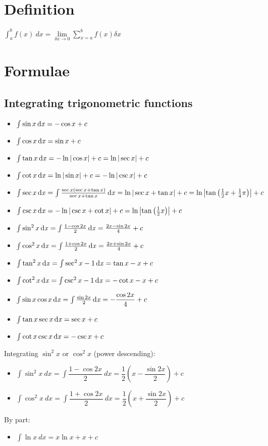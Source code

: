 \section{Definition}
$\int_{a}^{b} f(x) \: dx = \lim\limits_{\delta x\rightarrow0}\sum_{x=a}^{b}f(x)\delta x$

\section{Formulae}
\subsection{Integrating trigonometric functions}
\begin{itemize}
    \item $\int\sin x \operatorname{\mathrm{d}\mathit{x}} = -\cos x + c$
    \item $\int\cos x \operatorname{\mathrm{d}\mathit{x}} = \sin x + c$
    \item $\int \tan x \operatorname{\mathrm{d}\mathit{x}} = -\ln |\cos x| + c= \ln |\sec x| + c$
    \item $\int \cot x \operatorname{\mathrm{d}\mathit{x}} = \ln |\sin x| + c = -\ln |\csc x| + c$
    \item $\int \sec x \operatorname{\mathrm{d}\mathit{x}} = \int \frac{\sec x(\sec x + \tan x)}{\sec x + \tan x} \operatorname{\mathrm{d}\mathit{x}} = \ln |\sec x + \tan x| + c = \ln \left|\tan\left(\frac{1}{2}x+\frac{1}{4}\pi \right)\right| + c$
    \item $\int \csc x \operatorname{\mathrm{d}\mathit{x}} = -\ln|\csc x + \cot x| + c = \ln \left|\tan\left(\frac{1}{2}x\right)\right| + c$
    \item $\int \sin^2 x \operatorname{\mathrm{d}\mathit{x}} = \int \frac{1-\cos 2x}{2} \operatorname{\mathrm{d}\mathit{x}} = \frac{2x-\sin 2x}{4} + c$
    \item $\int \cos^2 x \operatorname{\mathrm{d}\mathit{x}} = \int \frac{1+\cos 2x}{2} \operatorname{\mathrm{d}\mathit{x}} = \frac{2x+\sin 2x}{4} + c$
    \item $\int \tan^2 x \operatorname{\mathrm{d}\mathit{x}} = \int \sec^2 x -1 \operatorname{\mathrm{d}\mathit{x}} = \tan x - x + c$
    \item $\int \cot^2 x \operatorname{\mathrm{d}\mathit{x}} = \int \csc^2 x -1 \operatorname{\mathrm{d}\mathit{x}} = -\cot x - x + c$
    \item $\int \sin x \cos x \operatorname{\mathrm{d}\mathit{x}} = \int \frac{\sin 2x}{2} \operatorname{\mathrm{d}\mathit{x}} = -\dfrac{\cos 2x}{4} + c$
    \item $\int \tan x \sec x \operatorname{\mathrm{d}\mathit{x}} = \sec x + c$
    \item $\int \cot x \csc x \operatorname{\mathrm{d}\mathit{x}} = -\csc x + c$
\end{itemize}
Integrating $\sin^2x$ or $\cos^2x$ (power descending):
\begin{itemize}
    \item $\int \sin ^2 x \: dx=\int \dfrac{1-\cos 2x}{2} \: dx=\dfrac{1}{2}\left(x-\dfrac{\sin 2x}{2}\right)+c$
    \item $\int \cos ^2 x \: dx=\int \dfrac{1+\cos 2x}{2} \: dx= \dfrac{1}{2}\left(x+\dfrac{\sin 2x}{2}\right)+c$
\end{itemize}
By part:
\begin{itemize}
    \item $\int \ln x \: dx = x\ln x + x + c$
\end{itemize}
